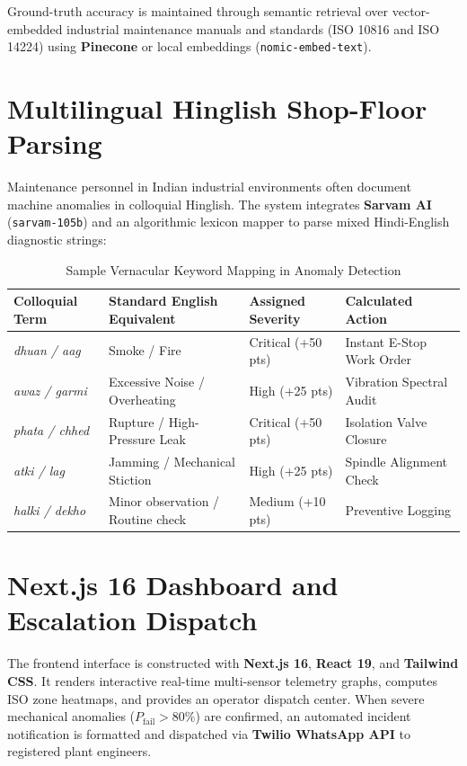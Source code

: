 \documentclass[12pt,a4paper,oneside]{report}
\begin{document}
Ground-truth accuracy is maintained through semantic retrieval over vector-embedded industrial maintenance manuals and standards (ISO 10816 and ISO 14224) using \textbf{Pinecone} or local embeddings (\texttt{nomic-embed-text}).

\section{Multilingual Hinglish Shop-Floor Parsing}
Maintenance personnel in Indian industrial environments often document machine anomalies in colloquial Hinglish. The system integrates \textbf{Sarvam AI} (\texttt{sarvam-105b}) and an algorithmic lexicon mapper to parse mixed Hindi-English diagnostic strings:

\begin{table}[H]
\centering
\caption{Sample Vernacular Keyword Mapping in Anomaly Detection}
\label{tab:vernacular_mapping}
\small
\begin{tabularx}{\textwidth}{p{32mm}p{42mm}p{30mm}X}
\toprule
\textbf{Colloquial Term} & \textbf{Standard English Equivalent} & \textbf{Assigned Severity} & \textbf{Calculated Action} \\
\midrule
\textit{dhuan / aag} & Smoke / Fire & Critical (+50 pts) & Instant E-Stop Work Order \\
\textit{awaz / garmi} & Excessive Noise / Overheating & High (+25 pts) & Vibration Spectral Audit \\
\textit{phata / chhed} & Rupture / High-Pressure Leak & Critical (+50 pts) & Isolation Valve Closure \\
\textit{atki / lag} & Jamming / Mechanical Stiction & High (+25 pts) & Spindle Alignment Check \\
\textit{halki / dekho} & Minor observation / Routine check & Medium (+10 pts) & Preventive Logging \\
\bottomrule
\end{tabularx}
\end{table}

\section{Next.js 16 Dashboard and Escalation Dispatch}
The frontend interface is constructed with \textbf{Next.js 16}, \textbf{React 19}, and \textbf{Tailwind CSS}. It renders interactive real-time multi-sensor telemetry graphs, computes ISO zone heatmaps, and provides an operator dispatch center. When severe mechanical anomalies ($P_{\text{fail}} > 80\%$) are confirmed, an automated incident notification is formatted and dispatched via \textbf{Twilio WhatsApp API} to registered plant engineers.
\end{document}
